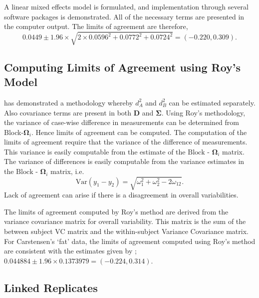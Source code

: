 \documentclass[12pt, a4paper]{report}
\theoremstyle{plain}
\theoremstyle{definition}
\theoremstyle{remark}
\begin{document}
	A linear mixed effects model is formulated, and implementation through several software packages is demonstrated.
	All of the necessary terms are presented in the computer output. The limits of agreement are therefore,
	\begin{equation}
	0.0449  \pm 1.96 \times  \sqrt{2 \times 0.0596^2 + 0.0772^2 + 0.0724^2} = (-0.220,  0.309).
	\end{equation}
	
	
	
	
	
	
	\subsection{Computing Limits of Agreement using Roy's Model}
	\citet{ARoy2009} has demonstrated a methodology whereby $d^2_{A}$ and $d^2_{B}$ can be estimated separately. Also covariance terms are present in both $\boldsymbol{D}$ and $\boldsymbol{\Sigma}$. Using Roy's methodology, the variance of case-wise difference in measurements can be determined from Block-$\boldsymbol{\Omega}_{i}$. Hence limits of agreement can be computed. The computation of the limits of agreement require that the variance of the difference of measurements. This variance is easily computable from the estimate of the ${\mbox{Block - }\boldsymbol \Omega_{i}}$ matrix.
	The variance of differences is easily computable from the variance estimates in the ${\mbox{Block - }\boldsymbol \Omega_{i}}$ matrix, i.e.
	\[
	\mathrm{Var}(y_1 - y_2) = \sqrt{ \omega^2_1 + \omega^2_2 - 2\omega_{12}}.
	\]	
	Lack of agreement can arise if there is a disagreement in overall variabilities. 
	
	The limits of agreement computed by Roy's method are derived from the variance covariance matrix for overall variability.
	This matrix is the sum of the between subject VC matrix and the within-subject Variance Covariance matrix.
	For Carstensen's `fat' data, the limits of agreement computed using Roy's
	method are consistent with the estimates given by \citet{BXC2008}; $0.044884  \pm 1.96 \times  0.1373979 = (-0.224,  0.314).$
	
	
	
	
	
	\subsection{Linked Replicates}
	
\end{document}
